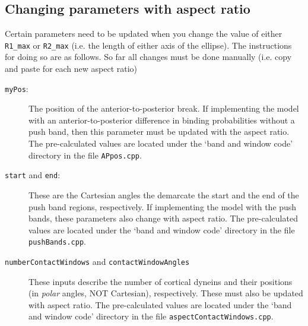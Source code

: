 \documentclass{article}
\begin{document}
\subsection{Changing parameters with aspect ratio}
Certain parameters need to be updated when you change the value of either \texttt{R1\_max} or \texttt{R2\_max} (i.e. the length of either axis of the ellipse). The instructions for doing so are as follows. So far all changes must be done manually (i.e. copy and paste for each new aspect ratio)
\begin{description}
  \item[\texttt{myPos}:] The position of the anterior-to-posterior break. If implementing the model with an anterior-to-posterior difference in binding probabilities without a push band, then this parameter must be updated with the aspect ratio. The pre-calculated values are located under the `band and window code' directory in the file \texttt{APpos.cpp}.
  \item[\texttt{start} and \texttt{end}:] These are the Cartesian angles the demarcate the start and the end of the push band regions, respectively. If implementing the model with the push bands, these parameters also change with aspect ratio. The pre-calculated values are located under the `band and window code' directory in the file \texttt{pushBands.cpp}.
  \item[\texttt{numberContactWindows} and \texttt{contactWindowAngles}] These inputs describe the number of cortical dyneins and their positions (in \emph{polar} angles, NOT Cartesian), respectively. These must also be updated with aspect ratio. The pre-calculated values are located under the `band and window code' directory in the file \texttt{aspectContactWindows.cpp}.
\end{description}
\end{document}
